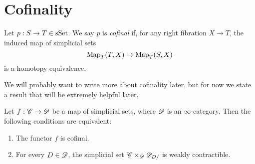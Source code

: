 \documentclass[../thesis.tex]{subfiles}
\begin{document}
\section{Cofinality}
\begin{definition}{\cite[Definition 4.1.1.1]{HTT}}
    Let \(p:S\to T \in \mathrm{sSet} \). We say $p$ is \emph{cofinal} if, for any right fibration $X\to T$, the induced map of simplicial sets
    \[
        \mathrm{Map}_T(T,X) \to \mathrm{Map}_T(S,X)
    \]
    is a homotopy equivalence.
\end{definition}
We will probably want to write more about cofinality later, but for now we state a result that will be extremely helpful later.
\begin{theorem}{\cite[Theorem 4.1.3.1]{HTT}}\label{superlemma}
    Let \(f: \mathscr{C} \to \mathscr{D}\) be a map of simplicial sets, where $\mathscr{D}$ is an $\infty$-category.
    Then the following conditions are equivalent:
    \begin{enumerate}
        \item The functor $f$ is cofinal.
        \item For every $D\in \mathscr{D}$, the simplicial set $\mathscr{C}\times_{\mathscr{D}} \mathscr{D}_{D/}$ is weakly contractible.
    \end{enumerate}
\end{theorem}
\end{document}
